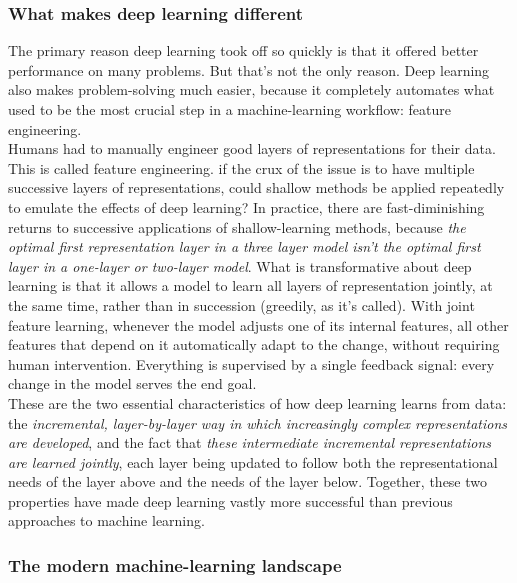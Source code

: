 \documentclass{article}
\numberwithin{equation}{section} %
\begin{document}
\subsubsection{What makes deep learning different}

The primary reason deep learning took off so quickly is that it offered better performance on many problems. But that’s not the only reason. Deep learning also makes problem-solving much easier, because it completely automates what used to be the most crucial step in a machine-learning workflow: feature engineering. \\

Humans had to manually engineer good layers of representations for their data. This is called feature engineering. if the crux of the issue is to have multiple successive layers of representations, could shallow methods be applied repeatedly to emulate the effects of deep learning? In practice, there are fast-diminishing returns to successive applications of shallow-learning methods, because \textit{the optimal first representation layer in a three layer model isn’t the optimal first layer in a one-layer or two-layer model}. What is transformative about deep learning is that it allows a model to learn all layers of representation
jointly, at the same time, rather than in succession (greedily, as it’s called). With joint feature learning, whenever the model adjusts one of its internal features, all other features that depend on it automatically adapt to the change, without requiring human intervention. Everything is supervised by a single feedback signal: every change in the model serves the end goal. \\

These are the two essential characteristics of how deep learning learns from data:
the \textit{incremental, layer-by-layer way in which increasingly complex representations are developed}, and the fact that \textit{these intermediate incremental representations are learned jointly}, each layer being updated to follow both the representational needs of the layer above and the needs of the layer below. Together, these two properties have made deep learning vastly more successful than previous approaches to machine learning. \\

\subsubsection{The modern machine-learning landscape}
\end{document}
